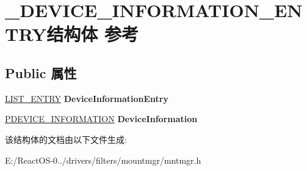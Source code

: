 \hypertarget{struct___d_e_v_i_c_e___i_n_f_o_r_m_a_t_i_o_n___e_n_t_r_y}{}\section{\+\_\+\+D\+E\+V\+I\+C\+E\+\_\+\+I\+N\+F\+O\+R\+M\+A\+T\+I\+O\+N\+\_\+\+E\+N\+T\+R\+Y结构体 参考}
\label{struct___d_e_v_i_c_e___i_n_f_o_r_m_a_t_i_o_n___e_n_t_r_y}
\subsection*{Public 属性}
\begin{DoxyCompactItemize}
\item 
\mbox{\label{struct___d_e_v_i_c_e___i_n_f_o_r_m_a_t_i_o_n___e_n_t_r_y_afe80093851f98051b652a8afaf453a9c}} 
\hyperlink{struct___l_i_s_t___e_n_t_r_y}{L\+I\+S\+T\+\_\+\+E\+N\+T\+RY} {\bfseries Device\+Information\+Entry}
\item 
\mbox{\label{struct___d_e_v_i_c_e___i_n_f_o_r_m_a_t_i_o_n___e_n_t_r_y_a5a3e8fd84eed0dadfe206e737d79bdcd}} 
\hyperlink{struct___d_e_v_i_c_e___i_n_f_o_r_m_a_t_i_o_n}{P\+D\+E\+V\+I\+C\+E\+\_\+\+I\+N\+F\+O\+R\+M\+A\+T\+I\+ON} {\bfseries Device\+Information}
\end{DoxyCompactItemize}


该结构体的文档由以下文件生成\+:\begin{DoxyCompactItemize}
\item 
E\+:/\+React\+O\+S-\/0../drivers/filters/mountmgr/mntmgr.\+h\end{DoxyCompactItemize}
